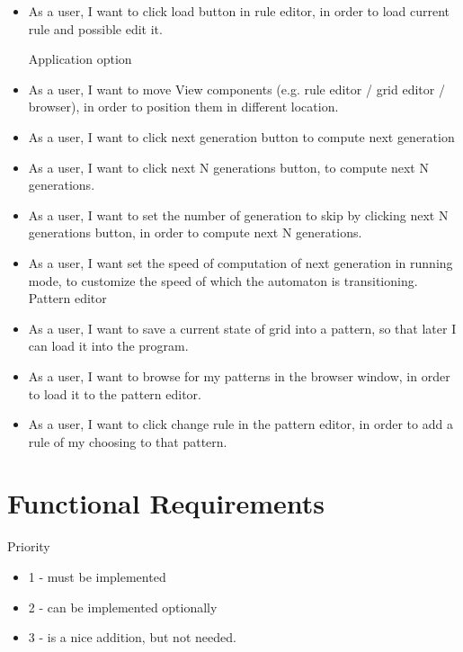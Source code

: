 \documentclass{article}
\begin{document}
\begin{itemize}
	\item 
		As a user,
		I want to click load button in rule editor,
		in order to load current rule and possible edit it.

	\vspace{30pt}
	Application option
	
	\item 
		As a user,
		I want to move View components (e.g. rule editor / grid editor / browser),
		in order to position them in different location.
	\item 
		As a user,
		I want to click next generation button 
		to compute next generation
	\item 
		As a user,
		I want to click next N generations button,
		to compute next N generations.
	\item 
		As a user,
		I want to set the number of generation to skip by clicking next N generations button,
		in order to compute next N generations.
	\item 
		As a user,
		I want set the speed of computation of next generation in running mode,
		to customize the speed of which the automaton is transitioning. \\
		
		Pattern editor
	\item 
		As a user,
		I want to save a current state of grid into a pattern,
		so that later I can load it into the program.

	\item 
		As a user,
		I want to browse for my patterns in the browser window,
		in order to load it to the pattern editor.

	\item 
		As a user,
		I want to click change rule in the pattern editor,
		in order to add a rule of my choosing to that pattern.
		
\end{itemize}

\newpage

\section{Functional Requirements}
Priority
\begin{itemize} 
\item 1 - must be implemented
\item 2 - can be implemented optionally 
\item 3 - is a nice addition, but not needed.
\end{itemize} 
\end{document}
